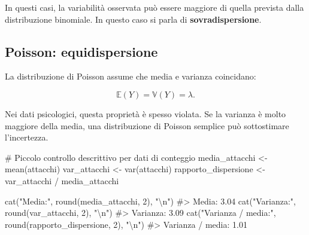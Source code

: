 \documentclass[
  italian,
  letterpaper,
  a4paper,
  11pt,
  open=any]{scrbook}
\newenvironment{Shaded}{\begin{snugshade}}{\end{snugshade}}
\newcommand{\CommentTok}[1]{\textcolor[rgb]{0.37,0.37,0.37}{#1}}
\newcommand{\DecValTok}[1]{\textcolor[rgb]{0.68,0.00,0.00}{#1}}
\newcommand{\FunctionTok}[1]{\textcolor[rgb]{0.28,0.35,0.67}{#1}}
\newcommand{\NormalTok}[1]{\textcolor[rgb]{0.00,0.23,0.31}{#1}}
\newcommand{\OtherTok}[1]{\textcolor[rgb]{0.00,0.23,0.31}{#1}}
\newcommand{\SpecialCharTok}[1]{\textcolor[rgb]{0.37,0.37,0.37}{#1}}
\newcommand{\StringTok}[1]{\textcolor[rgb]{0.13,0.47,0.30}{#1}}
\theoremstyle{plain}
\theoremstyle{definition}
\theoremstyle{definition}
\theoremstyle{remark}
\begin{document}
In questi casi, la variabilità osservata può essere maggiore di quella
prevista dalla distribuzione binomiale. In questo caso si parla di
\textbf{sovradispersione}.

\subsection{Poisson: equidispersione}\label{poisson-equidispersione}

La distribuzione di Poisson assume che media e varianza coincidano:

\[
\mathbb{E}(Y)=\mathbb{V}(Y)=\lambda.
\]

Nei dati psicologici, questa proprietà è spesso violata. Se la varianza
è molto maggiore della media, una distribuzione di Poisson semplice può
sottostimare l'incertezza.

\begin{Shaded}
\begin{Highlighting}[]
\CommentTok{\# Piccolo controllo descrittivo per dati di conteggio}
\NormalTok{media\_attacchi }\OtherTok{\textless{}{-}} \FunctionTok{mean}\NormalTok{(attacchi)}
\NormalTok{var\_attacchi }\OtherTok{\textless{}{-}} \FunctionTok{var}\NormalTok{(attacchi)}
\NormalTok{rapporto\_dispersione }\OtherTok{\textless{}{-}}\NormalTok{ var\_attacchi }\SpecialCharTok{/}\NormalTok{ media\_attacchi}

\FunctionTok{cat}\NormalTok{(}\StringTok{"Media:"}\NormalTok{, }\FunctionTok{round}\NormalTok{(media\_attacchi, }\DecValTok{2}\NormalTok{), }\StringTok{"}\SpecialCharTok{\textbackslash{}n}\StringTok{"}\NormalTok{)}
\CommentTok{\#\textgreater{} Media: 3.04}
\FunctionTok{cat}\NormalTok{(}\StringTok{"Varianza:"}\NormalTok{, }\FunctionTok{round}\NormalTok{(var\_attacchi, }\DecValTok{2}\NormalTok{), }\StringTok{"}\SpecialCharTok{\textbackslash{}n}\StringTok{"}\NormalTok{)}
\CommentTok{\#\textgreater{} Varianza: 3.09}
\FunctionTok{cat}\NormalTok{(}\StringTok{"Varianza / media:"}\NormalTok{, }\FunctionTok{round}\NormalTok{(rapporto\_dispersione, }\DecValTok{2}\NormalTok{), }\StringTok{"}\SpecialCharTok{\textbackslash{}n}\StringTok{"}\NormalTok{)}
\CommentTok{\#\textgreater{} Varianza / media: 1.01}
\end{Highlighting}
\end{Shaded}
\end{document}
